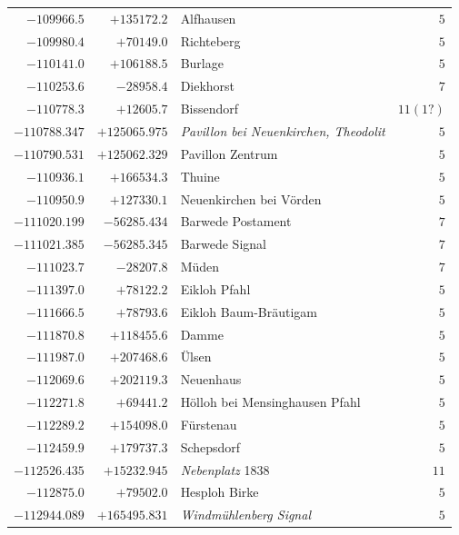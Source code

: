 \begin{center}
\begin{tabular}{r|r|p{170pt}|r}
\(-109966.5\)&\(+135172.2\)&Alfhausen&\(5\)\\
\(-109980.4\)&\(+70149.0\)&Richteberg&\(5\)\\
\(-110141.0\)&\(+106188.5\)&Burlage&\(5\)\\
\(-110253.6\)&\(-28958.4\)&Diekhorst&\(7\)\\
\(-110778.3\)&\(+12605.7\)&Bissendorf&\(11(1?)\)\\
\(-110788.347\)&\(+125065.975\)&\textit{Pavillon bei Neuenkirchen, Theodolit}&\(5\)\\
\(-110790.531\)&\(+125062.329\)&Pavillon Zentrum&\(5\)\\
\(-110936.1\)&\(+166534.3\)&Thuine&\(5\)\\
\(-110950.9\)&\(+127330.1\)&Neuenkirchen bei Vörden&\(5\)\\
\(-111020.199\)&\(-56285.434\)&Barwede Postament&\(7\)\\
\(-111021.385\)&\(-56285.345\)&Barwede Signal&\(7\)\\
\(-111023.7\)&\(-28207.8\)&Müden&\(7\)\\
\(-111397.0\)&\(+78122.2\)&Eikloh Pfahl&\(5\)\\
\(-111666.5\)&\(+78793.6\)&Eikloh Baum-Bräutigam&\(5\)\\
\(-111870.8\)&\(+118455.6\)&Damme&\(5\)\\
\(-111987.0\)&\(+207468.6\)&Ülsen&\(5\)\\
\(-112069.6\)&\(+202119.3\)&Neuenhaus&\(5\)\\
\(-112271.8\)&\(+69441.2\)&Hölloh bei Mensinghausen Pfahl&\(5\)\\
\(-112289.2\)&\(+154098.0\)&Fürstenau&\(5\)\\
\(-112459.9\)&\(+179737.3\)&Schepsdorf&\(5\)\\
\(-112526.435\)&\(+15232.945\)&\textit{Nebenplatz} 1838&\(11\)\\
\(-112875.0\)&\(+79502.0\)&Hesploh Birke&\(5\)\\
\(-112944.089\)&\(+165495.831\)&\textit{Windmühlenberg Signal}&\(5\)\\
\hline\end{tabular}\endgroup\end{center}
